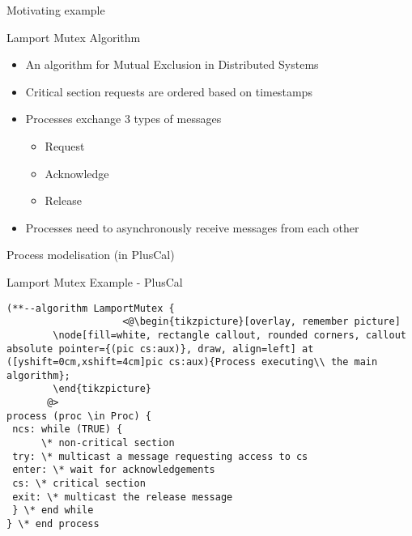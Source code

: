 \documentclass{beamer}
\begin{document}
\begin{frame}[fragile]{Motivating example}

\begin{block}{Lamport Mutex Algorithm}
\begin{itemize}
  \item An algorithm for Mutual Exclusion in Distributed Systems
  \item Critical section requests are ordered based on timestamps
  \item Processes exchange 3 types of messages
  \begin{itemize} 
        \item Request
        \item Acknowledge
        \item Release
    \end{itemize}
   \item Processes need to asynchronously receive messages from each other
\end{itemize}
\end{block}
\end{frame}

\begin{frame}[fragile]{Process modelisation (in PlusCal)}
\begin{exampleblock}{Lamport Mutex Example - PlusCal}
\begin{lstlisting}[language=pluscal, frame = none, numbers = none]
(**--algorithm LamportMutex {
                    <@\begin{tikzpicture}[overlay, remember picture]
        \node[fill=white, rectangle callout, rounded corners, callout absolute pointer={(pic cs:aux)}, draw, align=left] at ([yshift=0cm,xshift=4cm]pic cs:aux){Process executing\\ the main algorithm};
        \end{tikzpicture}
       @>
process (proc \in Proc) {
 ncs: while (TRUE) {
      \* non-critical section
 try: \* multicast a message requesting access to cs
 enter: \* wait for acknowledgements 
 cs: \* critical section
 exit: \* multicast the release message
 } \* end while
} \* end process
\end{lstlisting}
\end{exampleblock}
\end{frame}
\end{document}
